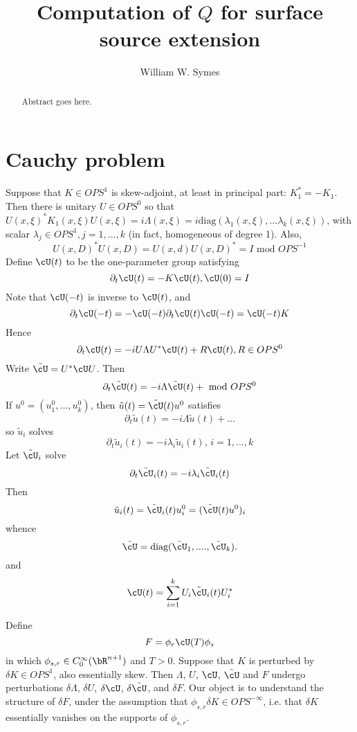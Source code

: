 \title{Computation of $Q$ for surface source extension}
\author{William W. Symes}

\begin{abstract}
  Abstract goes here.
\end{abstract}

\section{Cauchy problem}

Suppose that $K \in OPS^1$ is skew-adjoint, at least in principal
part: $K_1^*=-K_1$. Then there is unitary $U \in OPS^0$ so that
$U(x,\xi)^*K_1(x,\xi)U(x,\xi) = i\Lambda(x,\xi) =
i\mbox{diag}(\lambda_1(x,\xi),...\lambda_k(x,\xi))$, with scalar
$\lambda_j \in OPS^1, j=1,...,k$ (in fact, homogeneous of degree
1). Also,
\begin{equation}
  \label{eqn:ortho}
  U(x,D)^*U(x,D) = U(x,d)U(x,D)^* = I \mbox{ mod } OPS^{-1}
\end{equation}
Define $\cU(t)$ to be the one-parameter group satisfying
\[
  \partial_t \cU(t) = -K \cU(t), \cU(0)=I
\]
Note that $\cU(-t)$ is inverse to $\cU(t)$, and 
\[
  \partial_t \cU(-t) = -\cU(-t) \partial_t \cU(t) \cU(-t) = \cU(-t)K
\]
Hence
\[
  \partial_t \cU(t) = -iU \Lambda U^*\cU(t) + R\cU(t), R \in OPS^0 
\]
Write $\tilde{\cU} = U^*\cU U$. Then 
\[
  \partial_t \tilde{\cU}(t) = -i\Lambda \tilde{\cU}(t) + \mbox{ mod } OPS^0 
\]
If $u^0 = (u^0_1,...,u^0_k)$, then $\tilde{u}(t) = \tilde{\cU}(t)u^0$ satisfies
\[
  \partial_t \tilde{u}(t) = -i\Lambda \tilde{u}(t) + ...
\]
so $\tilde{u}_i$ solves
\[
  \partial_t \tilde{u}_i(t) = -i\lambda_i \tilde{u}_i(t), \, i=1,...,k
\]
Let $\tilde{\cU}_i$ solve
\begin{equation}
  \label{eqn:stilde}
  \partial_t \tilde{\cU}_i(t) = - i\lambda_i \tilde{\cU}_i(t)
\end{equation}
Then
\[
  \tilde{u}_i(t) = \tilde{\cU}_i(t) u^0_i = (\tilde{\cU}(t)u^0)_i 
\]
whence
\[
  \tilde{\cU} = \mbox{diag}(\tilde{\cU}_1,....,\tilde{\cU}_k).
\]
and
\begin{equation}
  \label{eqn:spec}
  \cU(t) = \sum_{i=1}^k U_i \tilde{\cU}_i(t)U_i^*
\end{equation}

Define
\[
  F = \phi_r \cU(T) \phi_s
\]
in which $\phi_{s,r} \in C_0^{\infty}(\bR^{n+1})$ and $T>0$. Suppose that $K$
is perturbed by $\delta K \in OPS^1$, also essentially skew. Then
$\Lambda$, $U$, $\cU$, $\tilde{\cU}$ and $F$ undergo perturbations
$\delta \Lambda$, $\delta U$, $\delta \cU$, $\delta \tilde{\cU}$, and
$\delta F$. Our object is to understand the structure of $\delta F$, under the
assumption that $\phi_{s,r} \delta K \in OPS^{-\infty}$, i.e. that
$\delta K$ essentially vanishes on the supports of $\phi_{s,r}$.

